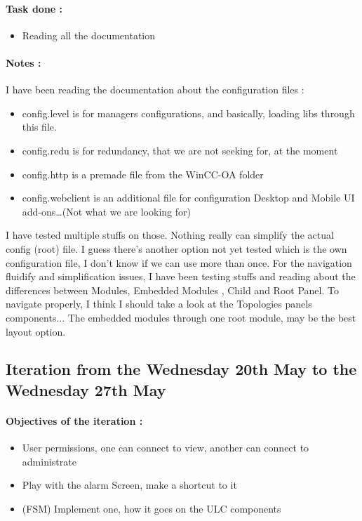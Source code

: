 \documentclass[a4paper, 10pt]{article}
\begin{document}
\paragraph{Task done :}
\begin{itemize}
    \item Reading all the documentation
\end{itemize}

\paragraph{Notes :} 
I have been reading the documentation about the configuration files :
\begin{itemize}
    \item config.level is for managers configurations, and basically, loading libs through this file.
    \item config.redu is for redundancy, that we are not seeking for, at the moment
    \item config.http is a premade file from the WinCC-OA folder
    \item config.webclient is an additional file for configuration Desktop and Mobile UI add-ons\dots (Not what we are looking for)
\end{itemize}
I have tested multiple stuffs on those. Nothing really can simplify the actual config (root) file.
I guess there's another option not yet tested which is the own configuration file, I don't know if we can use more than once.\newline
For the navigation fluidify and simplification issues, I have been testing stuffs and reading about the differences between Modules, Embedded Modules , Child and Root Panel.\newline
To navigate properly, I think I should take a look at the Topologies panels components... The embedded modules through one root module, may be the best layout option.

\subsection{Iteration from the Wednesday 20th May to the Wednesday 27th May}
\paragraph{Objectives of the iteration :}
\begin{itemize}
    \item User permissions, one can connect to view, another can connect to administrate
    \item Play with the alarm Screen, make a shortcut to it
    \item (FSM) Implement one, how it goes on the ULC components
\end{itemize}
\end{document}
